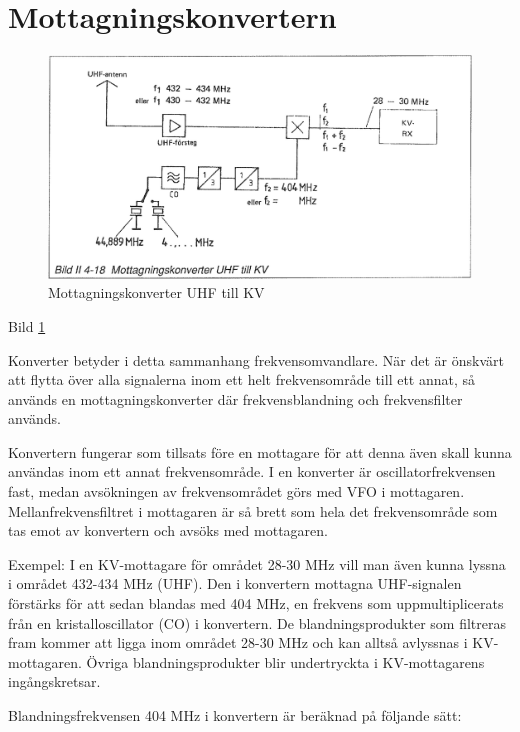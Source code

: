 \section{Mottagningskonvertern}

\begin{figure}
  \includegraphics[width=\textwidth]{images/bild_2_4-18}
  \caption{Mottagningskonverter UHF till KV}
  \label{fig:bildII4-18}
\end{figure}

Bild \ref{fig:bildII4-18}

Konverter betyder i detta sammanhang frekvensomvandlare. När det är
önskvärt att flytta över alla signalerna inom ett helt frekvensområde
till ett annat, så används en mottagningskonverter där
frekvensblandning och frekvensfilter används.

Konvertern fungerar som tillsats före en mottagare för att denna även
skall kunna användas inom ett annat frekvensområde. I en konverter är
oscillatorfrekvensen fast, medan avsökningen av frekvensområdet görs
med VFO i mottagaren. Mellanfrekvensfiltret i mottagaren är så brett
som hela det frekvensområde som tas emot av konvertern och avsöks med
mottagaren.

Exempel: I en KV-mottagare för området 28-30 MHz vill man även kunna
lyssna i området 432-434 MHz (UHF). Den i konvertern mottagna
UHF-signalen förstärks för att sedan blandas med 404 MHz, en frekvens
som uppmultiplicerats från en kristalloscillator (CO) i konvertern. De
blandningsprodukter som filtreras fram kommer att ligga inom området
28-30 MHz och kan alltså avlyssnas i KV-mottagaren. Övriga
blandningsprodukter blir undertryckta i KV-mottagarens ingångskretsar.

Blandningsfrekvensen 404 MHz i konvertern är beräknad på följande sätt:

